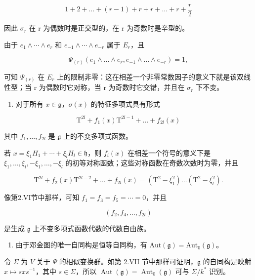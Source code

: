 \[
1 + 2 + \dots + (r - 1) + r + r + \dots + r + \frac {r}{2}
\]

因此 \(\sigma_{r}\) 在 r 为偶数时是正交型的，在 r 为奇数时是辛型的。

由于 \(e_{1} \wedge \cdots \wedge e_{r}\) 和 \(e_{-1} \wedge \cdots \wedge e_{-r}\) 属于 \(E_{r}\)，且

\[
\Psi_ {(r)} \left(e _ {1} \wedge \dots \wedge e _ {r}, e _ {- 1} \wedge \dots \wedge e _ {- r}\right) = 1,
\]

可知 \(\Psi_{(r)}\) 在 \(E_{r}\) 上的限制非零：这在相差一个非零常数因子的意义下就是该双线性型；当 r 为偶数时它对称，当 r 为奇数时它交错，并且在 \(\sigma_{r}\) 下不变。

\begin{enumerate}
\def\labelenumi{(\Roman{enumi})}
\setcounter{enumi}{5}
\tightlist
\item
对于所有 \(x \in \mathfrak{g}\)，\(\sigma(x)\) 的特征多项式具有形式
\end{enumerate}

\[
\mathrm{T} ^ {2 l} + f _ {1} (x) \mathrm{T} ^ {2 l - 1} + \dots + f _ {2 l} (x)
\]

其中 \(f_{1},\ldots ,f_{2l}\) 是 \(\mathfrak{g}\) 上的不变多项式函数。

若 \(x = \xi_{1}H_{1} + \cdots + \xi_{l}H_{l} \in \mathfrak{h}\)，则 \(f_{i}(x)\) 在相差一个符号的意义下是 \(\xi_{1}, \ldots, \xi_{l}, -\xi_{1}, \ldots, -\xi_{l}\) 的初等对称函数；这些对称函数在奇数次数时为零，并且

\[
\mathrm{T} ^ {2 l} + f _ {2} (x) \mathrm{T} ^ {2 l - 2} + \dots + f _ {2 l} (x) = (\mathrm{T} ^ {2} - \xi_ {1} ^ {2}) \ldots (\mathrm{T} ^ {2} - \xi_ {l} ^ {2}).
\]

像第2.VI节中那样，可知 \(f_{1}=f_{3}=f_{5}=\cdots=0\)，并且

\[
(f _ {2}, f _ {4}, \dots , f _ {2 l})
\]

是生成 \(\mathfrak{g}\) 上不变多项式函数代数的代数自由族。

\begin{enumerate}
\def\labelenumi{(\Roman{enumi})}
\setcounter{enumi}{6}
\tightlist
\item
由于邓金图的唯一自同构是恒等自同构，有 \(\mathrm{Aut}(\mathfrak{g}) = \mathrm{Aut}_0(\mathfrak{g})\)。
\end{enumerate}

令 \(\Sigma\) 为 \(V\) 关于 \(\Psi\) 的相似变换群。如第 2.VII 节中那样可证明，\(\mathfrak{g}\) 的自同构是映射 \(x \mapsto sxs^{-1}\)，其中 \(s \in \Sigma\)，所以 \(\operatorname{Aut}(\mathfrak{g}) = \operatorname{Aut}_0(\mathfrak{g})\) 可与 \(\Sigma / k^*\) 识别。

